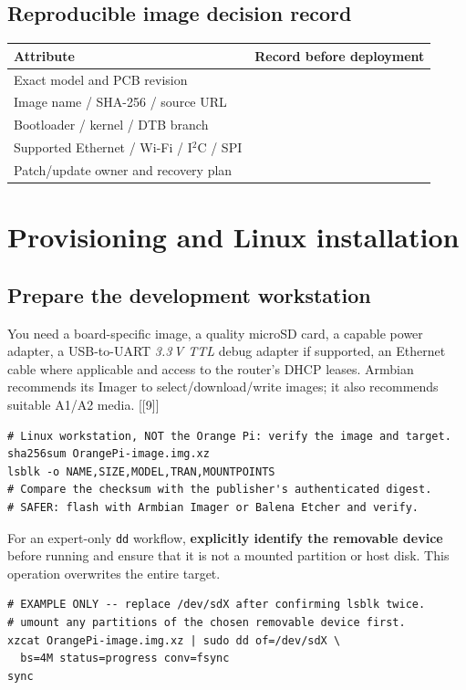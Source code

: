 \documentclass[10pt,oneside,openany]{report}
\newcommand{\code}[1]{\texttt{#1}}
\newcommand{\smallref}[1]{{\sffamily\scriptsize\color{slate}[#1]}}
\begin{document}
\section{Reproducible image decision record}
\begin{center}\small\begin{tabularx}{\textwidth}{@{}>{\raggedright\arraybackslash}p{3.6cm}>{\raggedright\arraybackslash}X@{}}\toprule
\textbf{Attribute} & \textbf{Record before deployment}\\\midrule
Exact model and PCB revision & \rule{0pt}{2.1ex}\dotfill\\
Image name / SHA-256 / source URL & \dotfill\\
Bootloader / kernel / DTB branch & \dotfill\\
Supported Ethernet / Wi-Fi / I\(^{2}\)C / SPI & \dotfill\\
Patch/update owner and recovery plan & \dotfill\\\bottomrule\end{tabularx}\end{center}

\chapter{Provisioning and Linux installation}
\section{Prepare the development workstation}
You need a board-specific image, a quality microSD card, a capable power adapter, a USB-to-UART \emph{3.3\,V TTL} debug adapter if supported, an Ethernet cable where applicable and access to the router's DHCP leases. Armbian recommends its Imager to select/download/write images; it also recommends suitable A1/A2 media. \smallref{[9]}
\begin{lstlisting}[style=sh]
# Linux workstation, NOT the Orange Pi: verify the image and target.
sha256sum OrangePi-image.img.xz
lsblk -o NAME,SIZE,MODEL,TRAN,MOUNTPOINTS
# Compare the checksum with the publisher's authenticated digest.
# SAFER: flash with Armbian Imager or Balena Etcher and verify.
\end{lstlisting}
For an expert-only \code{dd} workflow, \textbf{explicitly identify the removable device} before running and ensure that it is not a mounted partition or host disk. This operation overwrites the entire target.
\begin{lstlisting}[style=sh]
# EXAMPLE ONLY -- replace /dev/sdX after confirming lsblk twice.
# umount any partitions of the chosen removable device first.
xzcat OrangePi-image.img.xz | sudo dd of=/dev/sdX \
  bs=4M status=progress conv=fsync
sync
\end{lstlisting}
\end{document}
